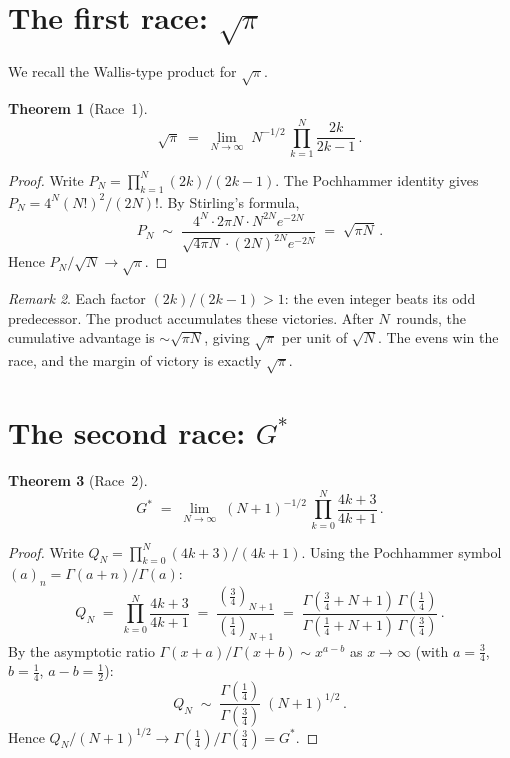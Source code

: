 \documentclass[12pt,reqno]{amsart}
\newtheorem{theorem}{Theorem}[section]
\theoremstyle{definition}
\theoremstyle{remark}
\newtheorem{remark}[theorem]{Remark}
\newcommand{\Gstar}{G^{\!*}}
\begin{document}
\section{The first race: $\sqrt{\pi}$}

We recall the Wallis-type product for $\sqrt{\pi}$.

\begin{theorem}[Race~1]\label{thm:race1}
\begin{equation}\label{eq:race1}
  \sqrt{\pi} \;=\; \lim_{N\to\infty}\;N^{-1/2}\,
  \prod_{k=1}^{N}\frac{2k}{2k-1}\,.
\end{equation}
\end{theorem}

\begin{proof}
Write $P_{N}=\prod_{k=1}^{N}(2k)/(2k-1)$.  The Pochhammer
identity gives $P_{N} = 4^{N}(N!)^{2}/(2N)!$.  By Stirling's formula,
\[
  P_{N} \;\sim\;
  \frac{4^{N}\cdot 2\pi N\cdot N^{2N}e^{-2N}}
  {\sqrt{4\pi N}\cdot(2N)^{2N}e^{-2N}}
  \;=\; \sqrt{\pi N}\,.
\]
Hence $P_{N}/\sqrt{N}\to\sqrt{\pi}$.
\end{proof}

\begin{remark}\label{rem:race1-meaning}
Each factor $(2k)/(2k-1) > 1$: the even integer beats its odd
predecessor.  The product accumulates these victories.  After $N$~rounds,
the cumulative advantage is $\sim\!\sqrt{\pi N}$, giving
$\sqrt{\pi}$ per unit of $\sqrt{N}$.  The evens win the race, and the
margin of victory is exactly $\sqrt{\pi}$.
\end{remark}


\section{The second race: $\Gstar$}

\begin{theorem}[Race~2]\label{thm:race2}
\begin{equation}\label{eq:race2}
  \Gstar \;=\; \lim_{N\to\infty}\;(N\!+\!1)^{-1/2}\,
  \prod_{k=0}^{N}\frac{4k+3}{4k+1}\,.
\end{equation}
\end{theorem}

\begin{proof}
Write $Q_{N}=\prod_{k=0}^{N}(4k+3)/(4k+1)$.  Using the Pochhammer
symbol $(a)_{n}=\Gamma(a+n)/\Gamma(a)$:
\[
  Q_{N} \;=\; \prod_{k=0}^{N}\frac{4k+3}{4k+1}
  \;=\; \frac{(\tfrac34)_{N+1}}{(\tfrac14)_{N+1}}
  \;=\; \frac{\Gamma(\tfrac34+N+1)\,\Gamma(\tfrac14)}
  {\Gamma(\tfrac14+N+1)\,\Gamma(\tfrac34)}\,.
\]
By the asymptotic ratio $\Gamma(x+a)/\Gamma(x+b)\sim x^{a-b}$ as
$x\to\infty$ (with $a=\tfrac34$, $b=\tfrac14$, $a-b=\tfrac12$):
\[
  Q_{N} \;\sim\;
  \frac{\Gamma(\tfrac14)}{\Gamma(\tfrac34)}\;(N+1)^{1/2}\,.
\]
Hence $Q_{N}/(N+1)^{1/2}\to\Gamma(\tfrac14)/\Gamma(\tfrac34)=\Gstar$.
\end{proof}
\end{document}
